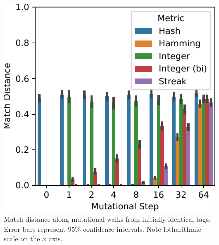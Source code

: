 \begin{figure}[!htbp]
\begin{center}

\includegraphics[width=\textwidth]{img/mutational_walk/bitweight=0dot5+seed=1+title=mutational_walk_barplot+_data_hathash_hash=8bf152d87daa9cb7+_script_fullcat_hash=44da7637259f16b6+ext=}
\caption{
Match distance along mutational walks from initially identical tags.
Error bars represent 95\% confidence intervals.
Note lotharithmic scale on the $x$ axis.
}
\label{fig:mutational_walk_barplot}

\end{center}
\end{figure}
